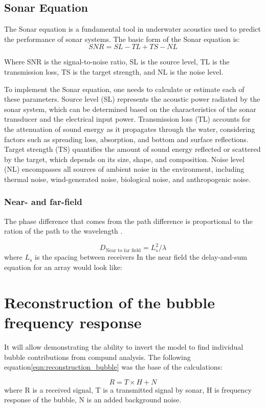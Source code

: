 	
\subsection{Sonar Equation }
The Sonar equation is a fundamental tool in underwater acoustics used to predict the performance of sonar systems. 
The basic form of the Sonar equation is:
\begin{equation}
    SNR=SL-TL+TS-NL
\end{equation}

Where
SNR is the signal-to-noise ratio,
SL is the source level,
TL is the transmission loss,
TS is the target strength, and
NL is the noise level.

To implement the Sonar equation, one needs to calculate or estimate each of these parameters. 
Source level (SL) represents the acoustic power radiated by the sonar system, which can be determined based on the characteristics of the sonar transducer and the electrical input power. 
Transmission loss (TL) accounts for the attenuation of sound energy as it propagates through the water, considering factors such as spreading loss, absorption, and bottom and surface reflections. 
Target strength (TS) quantifies the amount of sound energy reflected or scattered by the target, which depends on its size, shape, and composition. 
Noise level (NL) encompasses all sources of ambient noise in the environment, including thermal noise, wind-generated noise, biological noise, and anthropogenic noise.


\subsubsection{Near- and far-field}
The phase difference that comes from the path difference is proportional to the ration of the path to the wavelength \cite[p.30]{leighton_acoustic_2012}.

\[D_\text{Near to far field} = L_s^2/\lambda\] 
where $L_s$ is the spacing between receivers
In the near field the delay-and-sum equation for an array would look like:
\begin{equation}
    \label{eqn:far-field-DAS}
\end{equation}

\section{Reconstruction of the bubble frequency response}

It will allow demonstrating the ability to invert the model to find individual bubble contributions from compund analysis.
The following equation\ref{eqn:reconstruction_bubble} was the base of the calculations:

\begin{equation}\label{eqn:reconstruction_bubble}
    R = T \times H + N
\end{equation}
where R is a received signal, T is a transmitted signal by sonar, H is frequency response of the bubble, N is an added background noise.
